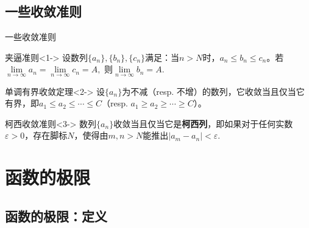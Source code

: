 
\subsection{一些收敛准则}


\begin{frame}{一些收敛准则}

\begin{block}{夹逼准则}<1->
设数列$\{a_n\},\{b_n\},\{c_n\}$满足：当$n > N$时，$a_n\leqslant b_n\leqslant c_n$。若$\lim\limits_{n\to\infty}a_n = \lim\limits_{n\to\infty}c_n = A,$ 则$\lim\limits_{n\to\infty}b_n = A.$
\end{block}

\begin{block}{单调有界收敛定理}<2->
设$\{a_n\}$为不减（resp. 不增）的数列，它收敛当且仅当它有界，即$a_1\leqslant a_2 \leqslant \cdots \leqslant C$（resp. $a_1\geqslant a_2 \geqslant \cdots \geqslant C$）。
\end{block}

\begin{block}{柯西收敛准则}<3->
数列$\{a_n\}$收敛当且仅当它是{\bfseries 柯西列}，即如果对于任何实数$\varepsilon > 0$，存在脚标$N$，使得由$m,n>N$能推出$|a_m-a_n| < \varepsilon.$
\end{block}

\end{frame}


\section{函数的极限}


\subsection{函数的极限：定义}


